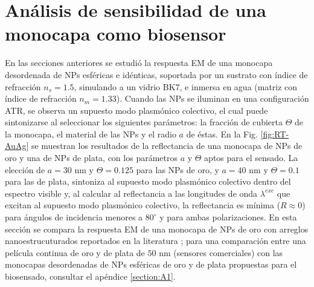 \section{Análisis de sensibilidad  de una monocapa como biosensor}
\label{section:sensLambda}

En las secciones anteriores se estudió la respuesta EM de una monocapa desordenada de NPs esféricas e idénticas, soportada por un sustrato con índice de refracción $n_s=1.5$, simulando a un vidrio BK7, e inmersa en agua (matriz con índice de refracción $n_m=1.33$). Cuando las NPs se iluminan en una configuración ATR, se observa un supuesto modo  plasmónico colectivo, el cual puede sintonizarse al seleccionar los siguientes parámetros: la fracción de cubierta $\Theta$ de la monocapa, el material de las NPs y el radio $a$ de éstas. En la Fig. \ref{fig:RT-AuAg} se muestran los resultados de la reflectancia de una monocapa de NPs de oro y una de NPs de plata, con los parámetros $a$ y $\Theta$ aptos para el sensado. La elección de $a=30$ nm y $\Theta=0.125$ para las NPs de oro, y $a=40$ nm y $\Theta=0.1$ para las de plata, sintoniza al supuesto modo  plasmónico colectivo dentro del espectro visible y, al calcular al reflectancia a las longitudes de onda $\lambda^{exc}$ que excitan al supuesto modo  plasmónico colectivo, la reflectancia es mínima ($R\approx 0$) para ángulos de incidencia menores a $80^\circ$ y para ambas polarizaciones. En esta sección se compara la respuesta EM de una monocapa de NPs de oro con arreglos nanoestrucuturados reportados en la literatura \cite{danilov2018ultra,svedendahl2009refractometric}; para una comparación entre una película continua de oro y de plata de $50$ nm (sensores comerciales) con las monocapas desordenadas de NPs esféricas de oro y de plata propuestas para el biosensado, consultar el apéndice \ref{section:A1}.

